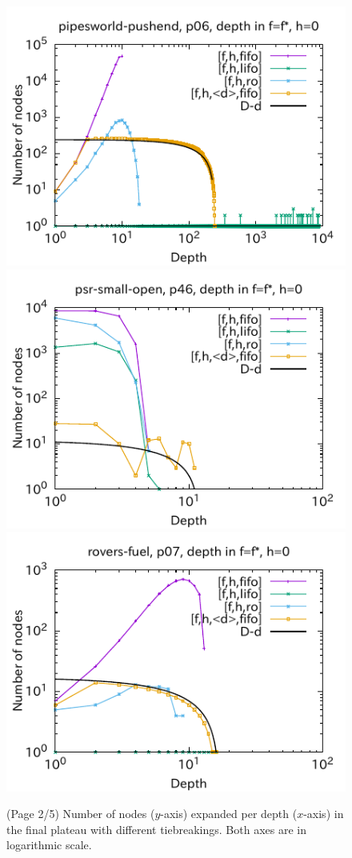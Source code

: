 \begin{figure}[htbp]
\includegraphics{img/output-lmcut/pipesworld-pushend/p06-0.pdf}
\includegraphics{img/output-lmcut/psr-small-open/p46-0.pdf}
\includegraphics{img/output-lmcut/rovers-fuel/p07-0.pdf}
 \caption{(Page 2/5) Number of nodes ($y$-axis) expanded per depth ($x$-axis) in
 the final plateau with different tiebreakings. Both axes are in logarithmic scale.
 }
 \label{fig:depth-histogram2}
\end{figure}

